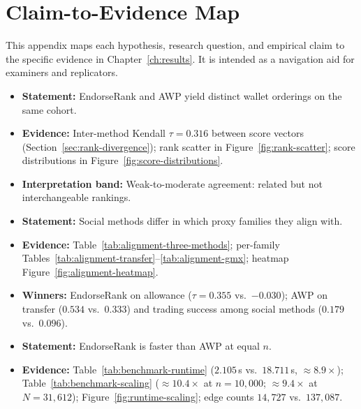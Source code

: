\section{Claim-to-Evidence Map}
\label{ch:appendix-claims}

This appendix maps each hypothesis, research question, and empirical claim to the specific evidence in Chapter~\ref{ch:results}. It is intended as a navigation aid for examiners and replicators.


\begin{itemize}
\item \textbf{Statement:} EndorseRank and AWP yield distinct wallet orderings on the same cohort.

\item \textbf{Evidence:} Inter-method Kendall $\tau=0.316$ between score vectors (Section~\ref{sec:rank-divergence}); rank scatter in Figure~\ref{fig:rank-scatter}; score distributions in Figure~\ref{fig:score-distributions}.

\item \textbf{Interpretation band:} Weak-to-moderate agreement: related but not interchangeable rankings.
\end{itemize}


\begin{itemize}
\item \textbf{Statement:} Social methods differ in which proxy families they align with.

\item \textbf{Evidence:} Table~\ref{tab:alignment-three-methods}; per-family Tables~\ref{tab:alignment-transfer}--\ref{tab:alignment-gmx}; heatmap Figure~\ref{fig:alignment-heatmap}.

\item \textbf{Winners:} EndorseRank on allowance ($\tau=0.355$ vs.\ $-0.030$); AWP on transfer ($0.534$ vs.\ $0.333$) and trading success among social methods ($0.179$ vs.\ $0.096$).
\end{itemize}


\begin{itemize}
\item \textbf{Statement:} EndorseRank is faster than AWP at equal $n$.

\item \textbf{Evidence:} Table~\ref{tab:benchmark-runtime} ($2.105$\,s vs.\ $18.711$\,s, $\approx 8.9\times$); Table~\ref{tab:benchmark-scaling} ($\approx 10.4\times$ at $n=10{,}000$; $\approx 9.4\times$ at $N=31{,}612$); Figure~\ref{fig:runtime-scaling}; edge counts $14{,}727$ vs.\ $137{,}087$.
\end{itemize}

